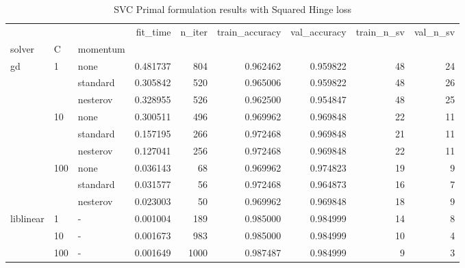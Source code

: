 \begin{table}[H]
\centering
\caption{SVC Primal formulation results with Squared Hinge loss}
\label{primal_svc_squared_hinge_cv_results}
\begin{tabular}{lllrrrrrr}
\toprule
          &     &   &  fit\_time &  n\_iter &  train\_accuracy &  val\_accuracy &  train\_n\_sv &  val\_n\_sv \\
solver & C & momentum &           &         &                 &               &             &           \\
\midrule
gd & 1   & none &  0.481737 &     804 &        0.962462 &      0.959822 &          48 &        24 \\
          &     & standard &  0.305842 &     520 &        0.965006 &      0.959822 &          48 &        26 \\
          &     & nesterov &  0.328955 &     526 &        0.962500 &      0.954847 &          48 &        25 \\
          & 10  & none &  0.300511 &     496 &        0.969962 &      0.969848 &          22 &        11 \\
          &     & standard &  0.157195 &     266 &        0.972468 &      0.969848 &          21 &        11 \\
          &     & nesterov &  0.127041 &     256 &        0.972468 &      0.969848 &          22 &        11 \\
          & 100 & none &  0.036143 &      68 &        0.969962 &      0.974823 &          19 &         9 \\
          &     & standard &  0.031577 &      56 &        0.972468 &      0.964873 &          16 &         7 \\
          &     & nesterov &  0.023003 &      50 &        0.969962 &      0.969848 &          18 &         9 \\
liblinear & 1   & - &  0.001004 &     189 &        0.985000 &      0.984999 &          14 &         8 \\
          & 10  & - &  0.001673 &     983 &        0.985000 &      0.984999 &          10 &         4 \\
          & 100 & - &  0.001649 &    1000 &        0.987487 &      0.984999 &           9 &         3 \\
\bottomrule
\end{tabular}
\end{table}
